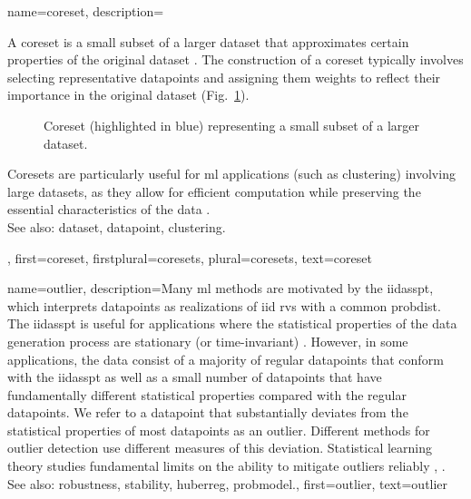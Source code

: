 {name={coreset}, 
	description={A coreset is a small subset of a larger \gls{dataset} 
		that approximates certain properties of the original \gls{dataset} \cite{Chai2023}. 
		The construction of a coreset typically involves selecting representative \glspl{datapoint}
		and assigning them \glspl{weight} to reflect their importance in the original \gls{dataset} (Fig.\ \ref{fig_coreset_dict}).
        		\begin{figure}[H]
			\centering
		\caption{Coreset (highlighted in blue) representing a small subset of a larger \gls{dataset}. \label{fig_coreset_dict}}
		\end{figure}
		Coresets are particularly useful for \gls{ml} applications (such as \gls{clustering}) 
		involving large \glspl{dataset}, as they allow for efficient computation while 
		preserving the essential characteristics of the \gls{data} \cite{DistkmeansBalcan2013}.
				\\
		See also: \gls{dataset}, \gls{datapoint}, \gls{clustering}.},
	first={coreset},
	firstplural={coresets},
	plural={coresets},
	text={coreset} 
}

{name={outlier}, 
	description={Many \gls{ml} methods 
		are motivated by the \gls{iidasspt}, which interprets \glspl{datapoint} as \glspl{realization} of 
		\gls{iid} \glspl{rv} with a common \gls{probdist}. The \gls{iidasspt} is useful for applications  
		where the statistical properties of the \gls{data} generation process are stationary (or time-invariant) \cite{Brockwell91}. 
		However, in some applications, the \gls{data} consist of a majority of regular \glspl{datapoint} 
		that conform with the \gls{iidasspt} as well as a small number of \glspl{datapoint} that have fundamentally different 
       		statistical properties compared with the regular \glspl{datapoint}. We refer to 
		a \gls{datapoint} that substantially deviates from the statistical properties of 
		most \glspl{datapoint} as an outlier. Different methods for outlier detection 
		use different \glspl{measure} of this deviation. 
        		Statistical learning theory studies fundamental limits on the ability to 
		mitigate outliers reliably \cite{doi:10.1137/0222052}, \cite{10.1214/20-AOS1961}.
        		\\
		See also: \gls{robustness}, \gls{stability}, \gls{huberreg}, \gls{probmodel}.},
	 first={outlier},
	 text={outlier} 
}

